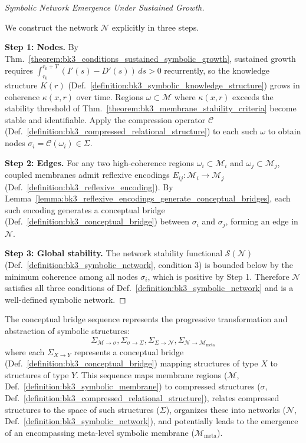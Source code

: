 \begin{proof}[Symbolic Network Emergence Under Sustained Growth]
\label{proof:bk3_sketch_symbolic_network_emergence}
\leavevmode

We construct the network $\mathcal{N}$ explicitly in three steps.

\textbf{Step 1: Nodes.}
By Thm.~\ref{theorem:bk3_conditions_sustained_symbolic_growth}, sustained growth
requires $\int_{r_0}^{r_0+T}(I'(s)-D'(s))\,ds > 0$ recurrently, so the
knowledge structure $K(r)$ (Def.~\ref{definition:bk3_symbolic_knowledge_structure})
grows in coherence $\kappa(x,r)$ over time. Regions $\omega \subset \mathcal{M}$
where $\kappa(x,r)$ exceeds the stability threshold of
Thm.~\ref{theorem:bk3_membrane_stability_criteria} become stable and
identifiable. Apply the compression operator $\mathcal{C}$
(Def.~\ref{definition:bk3_compressed_relational_structure}) to each such $\omega$
to obtain nodes $\sigma_i = \mathcal{C}(\omega_i) \in \Sigma$.

\textbf{Step 2: Edges.}
For any two high-coherence regions $\omega_i \subset \mathcal{M}_i$ and
$\omega_j \subset \mathcal{M}_j$, coupled membranes admit reflexive encodings
$E_{ij}: \mathcal{M}_i \to \mathcal{M}_j$ (Def.~\ref{definition:bk3_reflexive_encoding}).
By Lemma~\ref{lemma:bk3_reflexive_encodings_generate_conceptual_bridges}, each
such encoding generates a conceptual bridge (Def.~\ref{definition:bk3_conceptual_bridge})
between $\sigma_i$ and $\sigma_j$, forming an edge in $\mathcal{N}$.

\textbf{Step 3: Global stability.}
The network stability functional $\mathcal{S}(\mathcal{N})$
(Def.~\ref{definition:bk3_symbolic_network}, condition 3) is bounded below by
the minimum coherence among all nodes $\sigma_i$, which is positive by
Step 1. Therefore $\mathcal{N}$ satisfies all three conditions of
Def.~\ref{definition:bk3_symbolic_network} and is a well-defined symbolic network.
\end{proof}

\begin{definition} \label{definition:bk3_conceptual_bridge_sequence}
The conceptual bridge sequence represents the progressive transformation and abstraction of symbolic structures:
\[
\Sigma_{\mathcal{M} \rightarrow \sigma}, \Sigma_{\sigma \rightarrow \Sigma}, \Sigma_{\Sigma \rightarrow \mathcal{N}}, \Sigma_{\mathcal{N} \rightarrow \mathcal{M}_{\text{meta}}}
\]
where each $\Sigma_{X \rightarrow Y}$ represents a conceptual bridge (Def.~\ref{definition:bk3_conceptual_bridge}) mapping structures of type $X$ to structures of type $Y$. This sequence maps membrane regions ($\mathcal{M}$, Def.~\ref{definition:bk3_symbolic_membrane}) to compressed structures ($\sigma$, Def.~\ref{definition:bk3_compressed_relational_structure}), relates compressed structures to the space of such structures ($\Sigma$), organizes these into networks ($\mathcal{N}$, Def.~\ref{definition:bk3_symbolic_network}), and potentially leads to the emergence of an encompassing meta-level symbolic membrane ($\mathcal{M}_{\text{meta}}$).
\end{definition}

